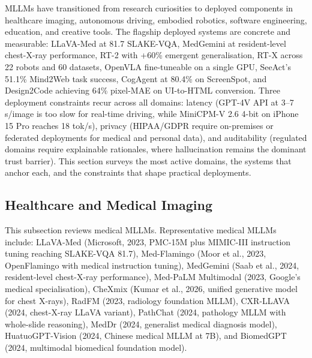 MLLMs have transitioned from research curiosities to deployed components in healthcare imaging, autonomous driving, embodied robotics, software engineering, education, and creative tools. The flagship deployed systems are concrete and measurable: LLaVA-Med at 81.7 SLAKE-VQA, MedGemini at resident-level chest-X-ray performance, RT-2 with +60\% emergent generalisation, RT-X across 22 robots and 60 datasets, OpenVLA fine-tuneable on a single GPU, SeeAct's 51.1\% Mind2Web task success, CogAgent at 80.4\% on ScreenSpot, and Design2Code achieving 64\% pixel-MAE on UI-to-HTML conversion. Three deployment constraints recur across all domains: latency (GPT-4V API at 3--7 s/image is too slow for real-time driving, while MiniCPM-V 2.6 4-bit on iPhone 15 Pro reaches 18 tok/s), privacy (HIPAA/GDPR require on-premises or federated deployments for medical and personal data), and auditability (regulated domains require explainable rationales, where hallucination remains the dominant trust barrier). This section surveys the most active domains, the systems that anchor each, and the constraints that shape practical deployments.

\subsection{Healthcare and Medical Imaging}\label{healthcare-and-medical-imaging}

This subsection reviews medical MLLMs. Representative medical MLLMs include: LLaVA-Med (Microsoft, 2023, PMC-15M plus MIMIC-III instruction tuning reaching SLAKE-VQA 81.7), Med-Flamingo (Moor et al., 2023, OpenFlamingo with medical instruction tuning), MedGemini (Saab et al., 2024, resident-level chest-X-ray performance), Med-PaLM Multimodal (2023, Google's medical specialisation), CheXmix (Kumar et al., 2026, unified generative model for chest X-rays), RadFM (2023, radiology foundation MLLM), CXR-LLAVA (2024, chest-X-ray LLaVA variant), PathChat (2024, pathology MLLM with whole-slide reasoning), MedDr (2024, generalist medical diagnosis model), HuatuoGPT-Vision (2024, Chinese medical MLLM at 7B), and BiomedGPT (2024, multimodal biomedical foundation model).


